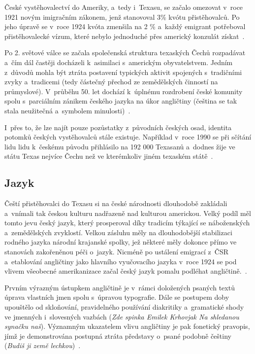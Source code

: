 České vystěhovalectví do Ameriky, a~tedy i~Texasu, se začalo omezovat v~roce 1921 novým imigračním zákonem, jenž stanovoval 3\% kvótu přistěhovalců. Po jeho úpravě se v~roce 1924 kvóta zmenšila na 2 \% a~každý emigrant potřeboval přistěhovalecké vízum, které nebylo jednoduché přes americký konzulát získat~\parencite{Vaculik2009b}.

Po 2. světové válce se začala společenská struktura texaských Čechů rozpadávat a~čím dál častěji docházeli k~asimilaci s~americkým obyvatelstvem. Jedním z~důvodů mohla být ztráta postavení typických aktivit spojených s~tradičními zvyky a~tradicemi (tedy částečný přechod ze zemědělských činností na průmyslové). V~průběhu 50. let dochází k~úplnému rozdrobení české komunity spolu s~parciálním zánikem českého jazyka na úkor angličtiny (čeština se tak stala neužitečná a~symbolem minulosti)~\parencite{Eckertova2004}.

I~přes to, že lze najít pouze pozůstatky z~původních českých osad, identita potomků českých vystěhovalců stále existuje. Například v~roce 1990 se při sčítání lidu lidu k~českému původu přihlásilo na 192 000 Texasanů a~dodnes žije ve státu Texas nejvíce Čechu než ve kterémkoliv jiném texaském státě~\parencite{Eckertova2004}.

\hypertarget{jazyk-2}{%
\subsection*{Jazyk}\label{jazyk-2}}

Čeští přistěhovalci do Texasu si na české národnosti dlouhodobě zakládali a~vnímali tak českou kulturu nadřazeně nad kulturou americkou. Velký podíl měl tomto jevu český jazyk, který prosperoval díky tradicím týkající se náboženských a~zemědělských zvyklostí. Velkou zásluhu měly na dlouhodobější stabilizaci rodného jazyka národní krajanské spolky, jež některé měly dokonce přímo ve stanovách zakořeněnou péči o~jazyk. Nicméně po ustálení emigrací z~ČSR a~etablování angličtiny jako hlavního vyučovacího jazyka v~roce 1924 se pod vlivem všeobecné amerikanizace začal český jazyk pomalu podléhat angličtině.~\parencite{amerika2017}.

Prvním výrazným ústupkem angličtině je v~rámci doložených psaných textů úprava vlastních jmen spolu s~úpravou typografie. Dále se postupem doby upouštělo od skloňování, pravidelného používání diakritiky a~gramatické shody ve jmenných i~slovesných vazbách (\emph{Zde spinka Emilek Krhovjak Na shledanou synačku naš}). Významným ukazatelem vlivu angličtiny je pak fonetický pravopis, jímž je demonstrována postupná ztráta představy o~psané podobně češtiny (\emph{Budiš ji země lechkou})~\parencite{Eckertová97}.

